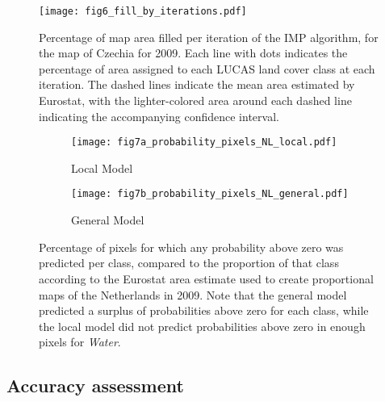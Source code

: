     \begin{figure}[H]
        \centering
        \texttt{[image: fig6\_fill\_by\_iterations.pdf]}
        \caption{Percentage of map area filled per iteration of the IMP algorithm, for the map of Czechia for 2009. Each line with dots indicates the percentage of area assigned to each LUCAS land cover class at each iteration. The dashed lines indicate the mean area estimated by Eurostat, with the lighter-colored area around each dashed line indicating the accompanying confidence interval.}
        \label{fig:fill_by_iterations}
    \end{figure}

    \begin{figure}[H]
        \vspace*{-4cm}
        \centering
        \begin{subfigure}[b]{\textwidth}
            \centering
            \caption{Local Model}\texttt{[image: fig7a\_probability\_pixels\_NL\_local.pdf]}
            \label{fig:probability_pixels_local}
        \end{subfigure}
        \begin{subfigure}[b]{\textwidth}
           \centering
           \caption{General Model}
           \texttt{[image: fig7b\_probability\_pixels\_NL\_general.pdf]}
           \label{fig:probability_pixels_general}   
        \end{subfigure}
        
        \caption{Percentage of pixels for which any probability above zero was predicted per class, compared to the proportion of that class according to the Eurostat area estimate used to create proportional maps of the Netherlands in 2009. Note that the general model predicted a surplus of probabilities above zero for each class, while the local model did not predict probabilities above zero in enough pixels for \textit{Water}.}
        \label{fig:probability_pixels}
    \end{figure}



    \subsection{Accuracy assessment}
    
